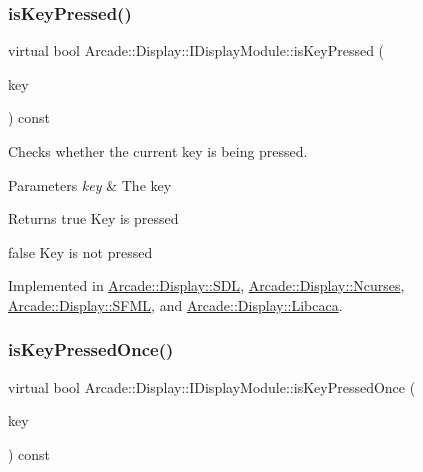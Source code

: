 \subsubsection{\texorpdfstring{isKeyPressed()}{isKeyPressed()}}
{\footnotesize\ttfamily virtual bool Arcade\+::\+Display\+::\+I\+Display\+Module\+::is\+Key\+Pressed (\begin{DoxyParamCaption}\item[{\mbox{\hyperlink{classArcade_1_1Display_1_1IDisplayModule_a8da3f6b309ca0581473ae8cc8789b619}{I\+Display\+Module\+::\+Keys}}}]{key }\end{DoxyParamCaption}) const\hspace{0.3cm}{\ttfamily [pure virtual]}}



Checks whether the current key is being pressed. 


\begin{DoxyParams}{Parameters}
{\em key} & The key \\
\hline
\end{DoxyParams}
\begin{DoxyReturn}{Returns}
true Key is pressed 

false Key is not pressed 
\end{DoxyReturn}


Implemented in \mbox{\hyperlink{classArcade_1_1Display_1_1SDL_ab7a692d8968af7633a92042ee006b83a}{Arcade\+::\+Display\+::\+S\+DL}}, \mbox{\hyperlink{classArcade_1_1Display_1_1Ncurses_a10f2b5576e60581c43719ab2ea882d93}{Arcade\+::\+Display\+::\+Ncurses}}, \mbox{\hyperlink{classArcade_1_1Display_1_1SFML_ad33097d101e94bbb65ea4eed560e03c4}{Arcade\+::\+Display\+::\+S\+F\+ML}}, and \mbox{\hyperlink{classArcade_1_1Display_1_1Libcaca_a4d76639289eee2453a416ff0fc051fe3}{Arcade\+::\+Display\+::\+Libcaca}}.

\mbox{\label{classArcade_1_1Display_1_1IDisplayModule_a531b700b332e077d9b714bafac05ebe1}} 
\subsubsection{\texorpdfstring{isKeyPressedOnce()}{isKeyPressedOnce()}}
{\footnotesize\ttfamily virtual bool Arcade\+::\+Display\+::\+I\+Display\+Module\+::is\+Key\+Pressed\+Once (\begin{DoxyParamCaption}\item[{\mbox{\hyperlink{classArcade_1_1Display_1_1IDisplayModule_a8da3f6b309ca0581473ae8cc8789b619}{I\+Display\+Module\+::\+Keys}}}]{key }\end{DoxyParamCaption}) const\hspace{0.3cm}{\ttfamily [pure virtual]}}



